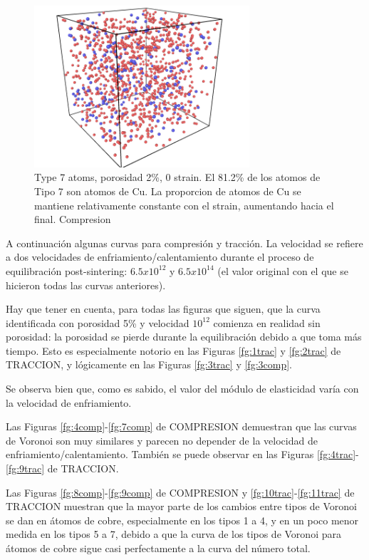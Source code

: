 \documentclass[10pt, oneside]{article} %
\begin{document}
\begin{figure}[H]
\centering
\includegraphics[width=8cm]{Figures/Porosidad/Porosidad_3_CU_tipo7.png}
\caption{Type 7 atoms, porosidad 2\%, 0 strain. El 81.2\% de los atomos de Tipo 7 son atomos de Cu. La proporcion de atomos de Cu se mantiene relativamente constante con el strain, aumentando hacia el final. Compresion}
\end{figure}

A continuación algunas curvas para compresión y tracción. La velocidad se refiere a dos velocidades de enfriamiento/calentamiento durante el proceso de equilibración post-sintering: $6.5x10^{12}$ y $6.5x10^{14}$ (el valor original con el que se hicieron todas las curvas anteriores). 

Hay que tener en cuenta, para todas las figuras que siguen, que la curva identificada con porosidad 5\% y velocidad $10^{12}$ comienza en realidad sin porosidad: la porosidad se pierde durante la equilibración debido a que toma más tiempo. Esto es especialmente notorio en las Figuras \ref{fg:1trac} y \ref{fg:2trac} de TRACCION, y lógicamente en las Figuras \ref{fg:3trac} y \ref{fg:3comp}.

Se observa bien que, como es sabido, el valor del módulo de elasticidad varía con la velocidad de enfriamiento.

Las Figuras \ref{fg:4comp}-\ref{fg:7comp} de COMPRESION demuestran que las curvas de Voronoi son muy similares y parecen no depender de la velocidad de enfriamiento/calentamiento. También se puede observar en las Figuras \ref{fg:4trac}-\ref{fg:9trac} de TRACCION.

Las Figuras \ref{fg:8comp}-\ref{fg:9comp} de COMPRESION y \ref{fg:10trac}-\ref{fg:11trac} de TRACCION muestran que la mayor parte de los cambios entre tipos de Voronoi se dan en átomos de cobre, especialmente en los tipos 1 a 4, y en un poco menor medida en los tipos 5 a 7, debido a que la curva de los tipos de Voronoi para átomos de cobre sigue casi perfectamente a la curva del número total.
\end{document}
